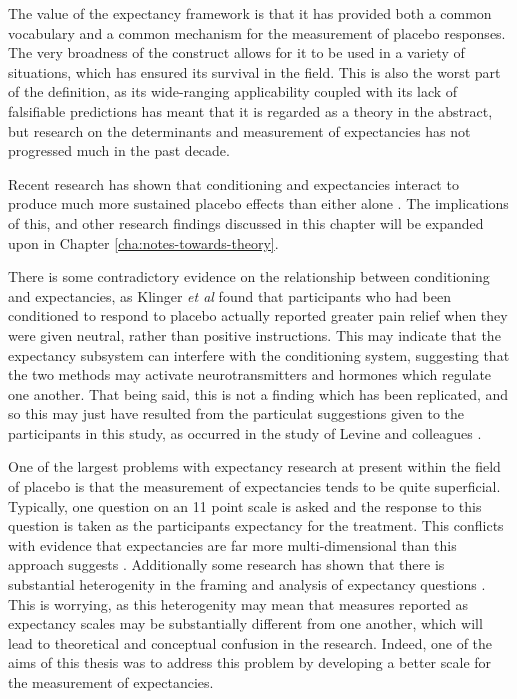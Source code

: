 The value of the expectancy framework is that it has provided both a common vocabulary and a common mechanism for the measurement of placebo responses. The very broadness of the construct allows for it to be used in a variety of situations, which has ensured its survival in the field. This is also the worst part of the definition, as its wide-ranging applicability coupled with its lack of falsifiable predictions has meant that it is regarded as a theory in the abstract, but research on the determinants and measurement of expectancies has not progressed much in the past decade. 

Recent research has shown that conditioning and expectancies interact to produce much more sustained placebo effects than either alone . The implications of this, and other research findings discussed in this chapter will be expanded upon in Chapter \ref{cha:notes-towards-theory}. 

There is some contradictory evidence on the relationship between conditioning and expectancies, as Klinger \textit{et al} \cite{Klinger2007a} found that participants who had been conditioned to respond to placebo actually reported greater pain relief when they were given neutral, rather than positive instructions. This may indicate that the expectancy subsystem can interfere with the conditioning system, suggesting that the two methods may activate neurotransmitters and hormones which regulate one another. That being said, this is not a finding which has been replicated, and so this may just have resulted from the particulat suggestions given to the participants in this study, as occurred in the study of Levine and colleagues \cite{Levine2006}. 

One of the largest problems with expectancy research at present within the field of placebo is that the measurement of expectancies tends to be quite superficial. Typically, one question on an 11 point scale is asked and the response to this question is taken as the participants expectancy for the treatment. This conflicts with evidence that expectancies are far more multi-dimensional than this approach suggests \cite{myers2008patient}. Additionally some research has shown that there is substantial heterogenity in the framing and analysis of expectancy questions \cite{myers2008patient}. This is worrying, as this heterogenity may mean that measures reported as expectancy scales may be substantially different from one another, which will lead to theoretical and conceptual confusion in the research. Indeed, one of the aims of this thesis was to address this problem by developing a better scale for the measurement of expectancies. 

